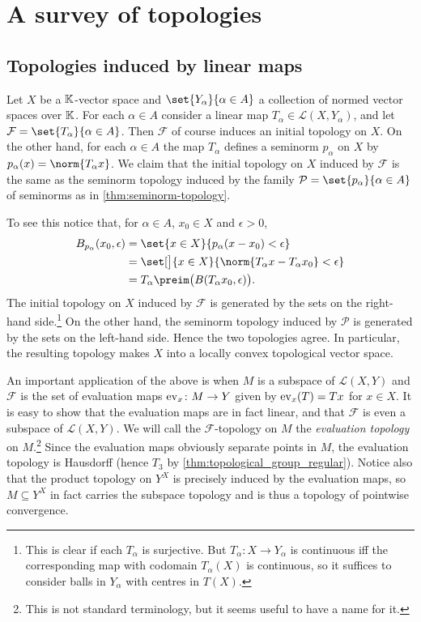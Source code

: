 \documentclass[article, a4paper, 11pt, oneside]{memoir}
\numberwithin{equation}{chapter}
\newcommand{\calP}{\mathcal{P}}
\newcommand{\calL}{\mathcal{L}}
\newcommand{\calF}{\mathcal{F}}
\begin{document}
\chapter{A survey of topologies}

\section{Topologies induced by linear maps}

Let $X$ be a $\mathbb{K}$-vector space and $\set{Y_\alpha}{\alpha \in A}$ a collection of normed vector spaces over $\mathbb{K}$. For each $\alpha \in A$ consider a linear map $T_\alpha \in \calL(X,Y_\alpha)$, and let $\calF = \set{T_\alpha}{\alpha \in A}$. Then $\calF$ of course induces an initial topology on $X$. On the other hand, for each $\alpha \in A$ the map $T_\alpha$ defines a seminorm $p_\alpha$ on $X$ by $p_\alpha(x) = \norm{T_\alpha x}$. We claim that the initial topology on $X$ induced by $\calF$ is the same as the seminorm topology induced by the family $\calP = \set{p_\alpha}{\alpha \in A}$ of seminorms as in \cref{thm:seminorm-topology}.

To see this notice that, for $\alpha \in A$, $x_0 \in X$ and $\epsilon > 0$,
%
\begin{align*}
    \ball[p_\alpha]{x_0}{\epsilon}
        &= \set{ x \in X }{ p_\alpha(x-x_0) < \epsilon } \\
        &= \set[\big]{ x \in X }{ \norm{T_\alpha x-T_\alpha x_0} < \epsilon } \\
        &= T_\alpha\preim \bigl( \ball{T_\alpha x_0}{\epsilon} \bigr).
\end{align*}
%
The initial topology on $X$ induced by $\calF$ is generated by the sets on the right-hand side.\footnote{This is clear if each $T_\alpha$ is surjective. But $T_\alpha \colon X \to Y_\alpha$ is continuous iff the corresponding map with codomain $T_\alpha(X)$ is continuous, so it suffices to consider balls in $Y_\alpha$ with centres in $T(X)$.} On the other hand, the seminorm topology induced by $\calP$ is generated by the sets on the left-hand side. Hence the two topologies agree. In particular, the resulting topology makes $X$ into a locally convex topological vector space.

An important application of the above is when $M$ is a subspace of $\calL(X,Y)$ and $\calF$ is the set of evaluation maps $\mathrm{ev}_x \colon M \to Y$ given by $\mathrm{ev}_x(T) = Tx$ for $x \in X$. It is easy to show that the evaluation maps are in fact linear, and that $\calF$ is even a subspace of $\calL(X,Y)$. We will call the $\calF$-topology on $M$ the \emph{evaluation topology} on $M$.\footnote{This is not standard terminology, but it seems useful to have a name for it.} Since the evaluation maps obviously separate points in $M$, the evaluation topology is Hausdorff (hence $T_3$ by \cref{thm:topological_group_regular}). Notice also that the product topology on $Y^X$ is precisely induced by the evaluation maps, so $M \subseteq Y^X$ in fact carries the subspace topology and is thus a topology of pointwise convergence.
\end{document}
